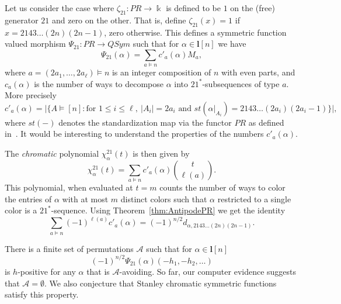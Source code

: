 \documentclass[ALCO,ThmDefs,Unicode,epreuves]{cedram}
\def\field{\Bbbk}
\begin{document}
\begin{exam} Let us consider the case where $\zeta_{21}\colon PR\to\field$ is defined to be $1$ on the (free) generator $21$
and zero on the other. That is, define $\zeta_{21}(x)=1$ if $x=2143\ldots(2n)(2n-1)$, zero otherwise.
This defines a symmetric function valued morphism $\Psi_{21}\colon PR\to QSym$
such that for $\alpha\in\mathbf{l}[n]$ we have
 $$ \Psi_{21}(\alpha)=\sum_{a\models n} c'_a(\alpha) M_a, $$
where $a=(2a_1,\ldots,2a_\ell)\models n$ is an integer composition of $n$ with even parts, and $c_a(\alpha)$ is the number of ways to decompose $\alpha$ into $21^*$-subsequences of type $a$.
More precisely
 $$c'_a(\alpha)=\big|\{ A\models [n] : \text{for } 1\le i\le \ell,\ |A_i|=2a_i \text{ and }st(\alpha|_{A_i})=2143\ldots(2a_i)(2a_i-1)\}\big|,$$
 where $st(-)$ denotes the standardization map via the functor $PR$ as defined in~\cite[Notation~2.5]{AM:2010}.
It would be interesting to understand the properties of the numbers $c'_a(\alpha)$.

The \emph{chromatic} polynomial $\chi^{21}_\alpha(t)$ is then given by
 $$ \chi^{21}_\alpha(t)=\sum_{a\models n} c'_a(\alpha) %
   \genfrac{(}{)}{0pt}{0}{t}{\ell(a)}. $$
 This polynomial, when evaluated at $t=m$ counts the number of ways to color the entries of $\alpha$ with at most $m$ distinct colors such that $\alpha$ restricted to a single color is a $21^*$-sequence.
 Using Theorem~\ref{thm:AntipodePR} we get the identity
 \begin{equation}\label{eq:PRidentity21}
 \sum_{a\models n} (-1)^{\ell(a)}c'_a(\alpha) = (-1)^{n/2} d_{\alpha,2143\ldots(2n)(2n-1)}.
 \end{equation}
\end{exam}

\begin{conjecture}\label{conj:h} There is a finite set of permutations $\mathcal{A}$ such that for $\alpha\in\mathbf{l}[n]$
 $$(-1)^{n/2}\Psi_{21}(\alpha)(-h_1,-h_2,\ldots)$$
is $h$-positive for any $\alpha$ that is $\mathcal{A}$-avoiding. So far, our computer evidence suggests that $\mathcal{A}=\emptyset$.
We also conjecture that Stanley chromatic symmetric functions satisfy this property.
\end{conjecture}
\end{document}
